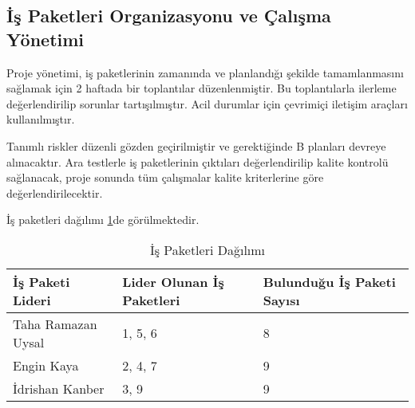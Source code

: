 \newpage

\subsection{İş Paketleri Organizasyonu ve Çalışma Yönetimi}

Proje yönetimi, iş paketlerinin zamanında ve planlandığı şekilde tamamlanmasını sağlamak için 2 haftada bir toplantılar düzenlenmiştir. Bu toplantılarla ilerleme değerlendirilip sorunlar tartışılmıştır. Acil durumlar için çevrimiçi iletişim araçları kullanılmıştır.

Tanımlı riskler düzenli gözden geçirilmiştir ve gerektiğinde B planları devreye alınacaktır. Ara testlerle iş paketlerinin çıktıları değerlendirilip kalite kontrolü sağlanacak, proje sonunda tüm çalışmalar kalite kriterlerine göre değerlendirilecektir.

İş paketleri dağılımı \ref{table:iş_paketleri}de görülmektedir.


\begin{table}[H]
\captionsetup{justification=raggedright, singlelinecheck=false, margin=0.5cm}
\centering
\caption{İş Paketleri Dağılımı}
\begin{tabular}{|l|l|l|}
\hline
\textbf{İş Paketi Lideri}   & \textbf{Lider Olunan İş Paketleri} & \textbf{Bulunduğu İş Paketi Sayısı} \\ \hline
Taha Ramazan Uysal         & 1, 5, 6                             & 8 \\ \hline
Engin Kaya                 & 2, 4, 7                             & 9 \\ \hline
İdrishan Kanber           & 3, 9                                & 9 \\ \hline
\end{tabular}
\label{table:iş_paketleri}
\end{table}




\begin{comment}
İlk 5 iş paketi Mühendislik Tasarımı, son 5 iş paketi de Bitirme Projesi
ile ilgilidir. Projede görev alan öğrenciler bu iş paketlerine sırayla
liderlik yapmalı ve sorumlu oldukları iş pakketinin vaktinde
tamamlanması konusunda o iş paketin de görevli diğer öğrencileri
uyarmalıdır. Her öğrenci en az bir iş paketinde liderlik görevi yapmalı
ve sorumluluk üstlenerek diğer öğrencilere neler yapmaları gerektiğini
anlatarak için bitmesini sağlamalıdır.

Hangi iş paketine kimin liderlik edeceği; o iş paketinde görevli diğer
öğrencilerden kimin hangi işi nekadar sürede yapacağı bu alt başlık
altında detaylıca verilmelidir.
\end{comment}


